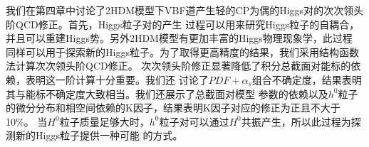 我们在第四章中讨论了2HDM模型下VBF道产生轻的CP为偶的Higgs对的次次领头阶QCD修正。首先，Higgs粒子对的产生
过程可以用来研究Higgs粒子的自耦合，并且可以重建Higgs势。另外2HDM模型有更加丰富的Higgs物理现象学，此过程
同样可以用于探索新的Higgs粒子。为了取得更高精度的结果，我们采用结构函数法计算次次领头阶QCD修正。
次次领头阶修正显著降低了积分总截面对能标的依赖，表明这一阶计算十分重要。我们还
讨论了$PDF+\alpha_s$组合不确定度，结果表明其与能标不确定度大致相当。我们还展示了总截面对模型
参数的依赖以及$h^0$粒子的微分分布和相空间依赖的K因子，结果表明K因子对应的修正为正且不大于10\%。
当$H^0$粒子质量足够大时，$h^0$粒子对可以通过$H^0$共振产生，所以此过程为探测新的Higgs粒子提供一种可能
的方式。


